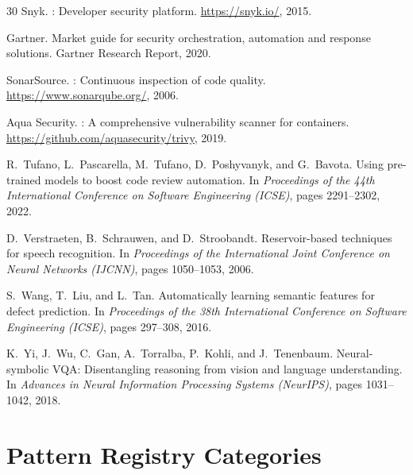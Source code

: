 \documentclass[11pt,a4paper]{article}
\begin{document}
\begin{thebibliography}{30}
{Snyk}.
: Developer security platform.
\newblock \url{https://snyk.io/}, 2015.

{Gartner}.
\newblock Market guide for security orchestration, automation and response solutions.
\newblock Gartner Research Report, 2020.

{SonarSource}.
: Continuous inspection of code quality.
\newblock \url{https://www.sonarqube.org/}, 2006.

{Aqua Security}.
: A comprehensive vulnerability scanner for containers.
\newblock \url{https://github.com/aquasecurity/trivy}, 2019.

R.~Tufano, L.~Pascarella, M.~Tufano, D.~Poshyvanyk, and G.~Bavota.
\newblock Using pre-trained models to boost code review automation.
\newblock In \emph{Proceedings of the 44th International Conference on Software Engineering (ICSE)}, pages 2291--2302, 2022.

D.~Verstraeten, B.~Schrauwen, and D.~Stroobandt.
\newblock Reservoir-based techniques for speech recognition.
\newblock In \emph{Proceedings of the International Joint Conference on Neural Networks (IJCNN)}, pages 1050--1053, 2006.

S.~Wang, T.~Liu, and L.~Tan.
\newblock Automatically learning semantic features for defect prediction.
\newblock In \emph{Proceedings of the 38th International Conference on Software Engineering (ICSE)}, pages 297--308, 2016.

K.~Yi, J.~Wu, C.~Gan, A.~Torralba, P.~Kohli, and J.~Tenenbaum.
\newblock Neural-symbolic {VQA}: Disentangling reasoning from vision and language understanding.
\newblock In \emph{Advances in Neural Information Processing Systems (NeurIPS)}, pages 1031--1042, 2018.

\end{thebibliography}

\appendix

\section{Pattern Registry Categories}
\label{app:patterns}
\end{document}
